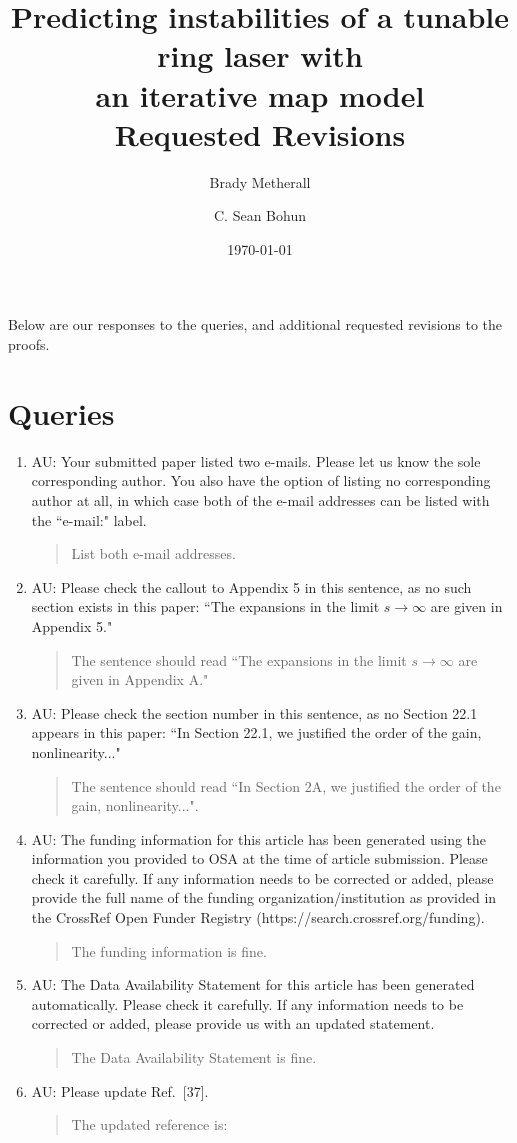 \documentclass[11pt,a4paper]{article}
\title{Predicting instabilities of a tunable ring laser with \\
an iterative map model \\ \Large Requested Revisions}
\author{Brady Metherall \and C. Sean Bohun}
\date{\today}
\begin{document}
\maketitle

Below are our responses to the queries, and additional requested revisions to the proofs.

\section{Queries}
\begin{enumerate}
	\item AU: Your submitted paper listed two e-mails. Please let us know the sole corresponding author. You also have the option of listing no corresponding author at all, in which case both of the e-mail addresses can be listed with the ``e-mail:" label.
	\begin{quote}
		List both e-mail addresses.
	\end{quote}
	\item AU: Please check the callout to Appendix 5 in this sentence, as no such section exists in this paper: ``The expansions in the limit $s \rightarrow \infty$ are given in Appendix 5."
	\begin{quote}
		The sentence should read ``The expansions in the limit $s \rightarrow \infty$ are given in Appendix A."
	\end{quote}
	\item AU: Please check the section number in this sentence, as no Section 22.1 appears in this paper: ``In Section 22.1, we justified the order of the gain, nonlinearity..."
	\begin{quote}
		The sentence should read ``In Section 2A, we justified the order of the gain, nonlinearity...".
	\end{quote}
	\item AU: The funding information for this article has been generated using the information you provided to OSA at the time of article submission. Please check it carefully. If any information needs to be corrected or added, please provide the full name of the funding organization/institution as provided in the CrossRef Open Funder Registry (https://search.crossref.org/funding).
	\begin{quote}
		The funding information is fine.
	\end{quote}
	\item AU: The Data Availability Statement for this article has been generated automatically. Please check it carefully. If any information needs to be corrected or added, please provide us with an updated statement.
	\begin{quote}
		The Data Availability Statement is fine.
	\end{quote}
	\item AU: Please update Ref.~[37].
	\begin{quote}
		The updated reference is:


\end{quote}
\end{enumerate}
\end{document}
